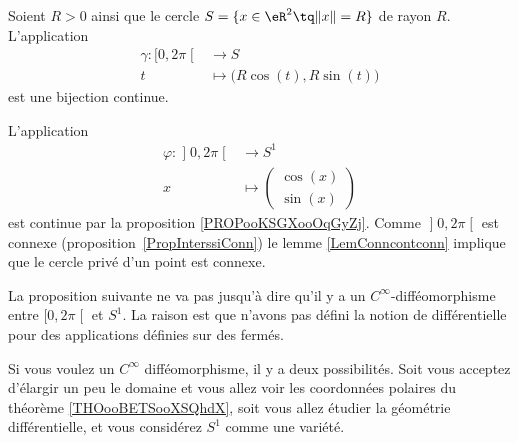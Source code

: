 \begin{corollary}       \label{CORooAKMKooORqcrO}
	Soient \( R>0\) ainsi que le cercle \( S=\{ x\in \eR^2\tq \| x \|=R \}\) de rayon \( R\). L'application
	\begin{equation}
		\begin{aligned}
			\gamma\colon \mathopen[ 0 , 2\pi \mathclose[ & \to S                                 \\
			t                                            & \mapsto \big( R\cos(t),R\sin(t) \big)
		\end{aligned}
	\end{equation}
	est une bijection continue.
\end{corollary}

\begin{example} \label{EXooJFDPooBZADKs}
	L'application
	\begin{equation}
		\begin{aligned}
			\varphi\colon \mathopen] 0 , 2\pi \mathclose[ & \to S^1                \\
			x                                             & \mapsto \begin{pmatrix}
				                                                        \cos(x) \\
				                                                        \sin(x)
			                                                        \end{pmatrix}
		\end{aligned}
	\end{equation}
	est continue par la proposition \ref{PROPooKSGXooOqGyZj}. Comme \( \mathopen] 0 , 2\pi \mathclose[\) est connexe (proposition~\ref{PropInterssiConn}) le lemme \ref{LemConncontconn} implique que le cercle privé d'un point est connexe.
\end{example}

La proposition suivante ne va pas jusqu'à dire qu'il y a un \( C^{\infty}\)-difféomorphisme entre \( \mathopen[ 0,2\pi\mathclose[\) et \( S^1\). La raison est que n'avons pas défini la notion de différentielle pour des applications définies sur des fermés.

Si vous voulez un \( C^{\infty}\) difféomorphisme, il y a deux possibilités. Soit vous acceptez d'élargir un peu le domaine et vous allez voir les coordonnées polaires du théorème \ref{THOooBETSooXSQhdX}, soit vous allez étudier la géométrie différentielle, et vous considérez \( S^1\) comme une variété.


